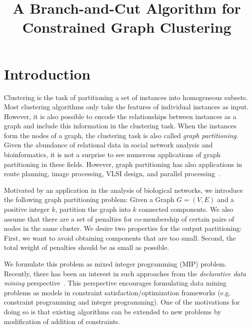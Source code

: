 \documentclass[conference,compsoc]{IEEEtran}
\begin{document}
\title{A Branch-and-Cut Algorithm for Constrained Graph Clustering}

\author{
\and
{}
\and
{}
}

\maketitle

\begin{abstract}
\lipsum[1]
\end{abstract}

\section{Introduction}
\label{introduction}

Clustering is the task of partitioning a set of instances into
homogeneous subsets. Most clustering algorithms only take the features
of individual instances as input. However, it is also possible to
encode the relationships between instances as a graph and include this
information in the clustering task. When the instances form the nodes
of a graph, the clustering task is also called \emph{graph
  partitioning}. Given the abundance of relational data in social
network analysis and bioinformatics, it is not a surprise to see
numerous applications of graph partitioning in these fields. However,
graph partitioning has also applications in route planning, image
processing, VLSI design, and parallel processing~\cite{Survey}.

Motivated by an application in the analysis of biological networks, we
introduce the following graph partitioning problem: Given a Graph
$G=(V, E)$ and a positive integer $k$, partition the graph into $k$
connected components. We also assume that there are a set of penalties
for co-membership of certain pairs of nodes in the same cluster. We
desire two properties for the output partitioning: First, we want to
avoid obtaining components that are too small. Second, the total
weight of penalties should be as small as possible.

We formulate this problem as mixed integer programming (MIP)
problem. Recently, there has been an interest in such
approaches from the \emph{declarative data mining}
perspective~\cite{vran,me}. This perspective encourages formulating
data mining problems as models in constraint satisfaction/optimization
frameworks (e.g. constraint programming and integer programming). One
of the motivations for doing so is that existing algorithms can be
extended to new problems by modification of addition of constraints.
\end{document}

